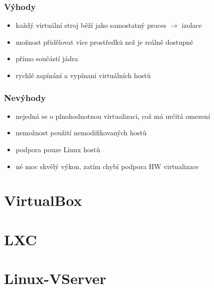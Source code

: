 \subsubsection{Výhody}
\begin{itemize}
  \item každý virtuální stroj běží jako samostatný proces $\rightarrow$ izolace
  \item možnost přidělovat více prostředků než je reálně dostupné
  \item přímo součástí jádra
  \item rychlé zapínání a vypínaní virtuálních hostů
\end{itemize}

\subsubsection{Nevýhody}
\begin{itemize}
  \item nejedná se o plnohodnotnou virtualizaci, což má určitá omezení
  \item nemožnost použití nemodifikovaných hostů
  \item podpora pouze Linux hostů
  \item né moc skvělý výkon, zatím chybí podpora HW virtualizace
\end{itemize}

\section{VirtualBox}

\section{LXC}
\section{Linux-VServer}
